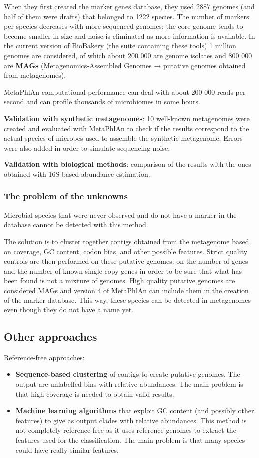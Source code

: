 When they first created the marker genes database, they used 2887 genomes (and half of them were drafts) that belonged to 1222 species. The number of markers per species decreases with more sequenced genomes: the core genome tends to become smaller in size and noise is eliminated as more information is available. In the current version of BioBakery (the suite containing these tools) 1 million genomes are considered, of which about 200 000 are genome isolates and 800 000 are \textbf{MAGs} (Metagenomics-Assembled Genomes → putative genomes obtained from metagenomes).

MetaPhlAn computational performance can deal with about 200 000 reads per second and  can profile thousands of microbiomes in some hours. 

\textbf{Validation with synthetic metagenomes}: 10 well-known metagenomes were created and evaluated with MetaPhlAn to check if the results correspond to the actual species of microbes used to assemble the synthetic metagenome. Errors were also added in order to simulate sequencing noise. 

\textbf{Validation with biological methods}: comparison of the results with the ones obtained with 16S-based abundance estimation.

\subsubsection{The problem of the unknowns}

Microbial species that were never observed and do not have a marker in the database cannot be detected with this method.

The solution is to cluster together contigs obtained from the metagenome based on coverage, GC content, codon bias, and other possible features. Strict quality controls are then performed on these putative genomes: on the number of genes and the number of known single-copy genes in order to be sure that what has been found is not a mixture of genomes. High quality putative genomes are considered MAGs and version 4 of MetaPhlAn can include them in the creation of the marker database. This way, these species can be detected in metagenomes even though they do not have a name yet.

\subsection{Other approaches}

Reference-free approaches:
\begin{itemize}
    \item \textbf{Sequence-based clustering} of contigs to create putative genomes. The output are unlabelled bins with relative abundances. The main problem is that high coverage is needed to obtain valid results.
    \item \textbf{Machine learning algorithms} that exploit GC content (and possibly other features) to give as output clades with relative abundances. This method is not completely reference-free as it uses reference genomes to extract the features used for the classification. The main problem is that many species could have really similar features.
\end{itemize}

